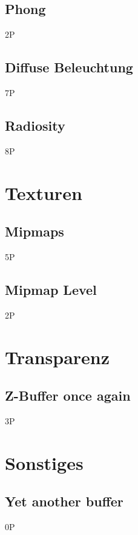 \documentclass{article}
\def\points#1{\begin{flushright}#1\end{flushright}}
\begin{document}
\subsection{Phong}
 \points{2P}
\subsection{Diffuse Beleuchtung}
 \points{7P}
\subsection{Radiosity}
 \points{8P}

\section{Texturen}
\subsection{Mipmaps}
 \points{5P}
\subsection{Mipmap Level}
 \points{2P}


\section{Transparenz}
\subsection{Z-Buffer once again}
 \points{3P}

\section{Sonstiges}
\subsection{Yet another buffer}
 \points{0P}
\end{document}
